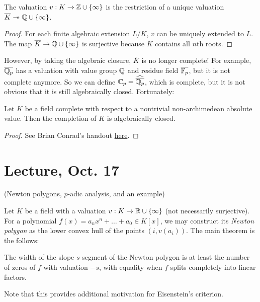 \documentclass[11pt]{amsart}
\begin{document}
\begin{cor}
The valuation $v: K\to \mathbb{Z}\cup\{\infty\}$ is the restriction of a unique valuation $\overline{K} \twoheadrightarrow \mathbb{Q}\cup\{\infty\}$.
\end{cor}

\begin{proof}
For each finite algebraic extension $L/K$, $v$ can be uniquely extended to $L$. The map $\overline{K} \to \mathbb{Q}\cup\{\infty\}$ is surjective because $\bar{K}$ contains all $n$th roots.
\end{proof}

However, by taking the algebraic closure, $\bar{K}$ is no longer complete! For example, $\overline{\mathbb{Q}_p}$ has a valuation with value group $\mathbb{Q}$ and residue field $\overline{\mathbb{F}_p}$, but it is not complete anymore. So we can define $\mathbb{C}_p = \widehat{\overline{\mathbb{Q}_p}}$, which is complete, but it is not obvious that it is still algebraically closed. Fortunately:

\begin{thm}
Let $K$ be a field complete with respect to a nontrivial non-archimedean absolute value. Then the completion of $\bar{K}$ is algebraically closed.
\end{thm}

\begin{proof}
See Brian Conrad's handout \href{http://math.stanford.edu/~conrad/248APage/handouts/algclosurecomp.pdf}{here}.
\end{proof}

\section{Lecture, Oct. 17}

(Newton polygons, $p$-adic analysis, and an example)

Let $K$ be a field with a valuation $v: K\to \mathbb{R}\cup\{\infty\}$ (not necessarily surjective). For a polynomial $f(x) = a_nx^n + \dots + a_0 \in K[x]$, we may construct its \emph{Newton polygon} as the lower convex hull of the points $(i, v(a_i))$. The main theorem is the follows:

\begin{thm}
The width of the slope $s$ segment of the Newton polygon is at least the number of zeros of $f$ with valuation $-s$, with equality when $f$ splits completely into linear factors.
\end{thm}

Note that this provides additional motivation for Eisenstein's criterion.
\end{document}
